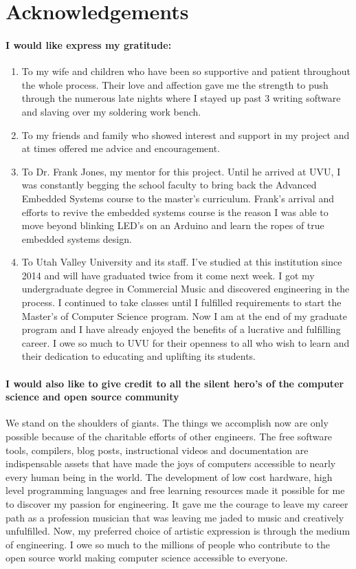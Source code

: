 \documentclass[acmlarge,screen]{acmart}
\begin{document}
\section{Acknowledgements}
	\paragraph{I would like express my gratitude:}
	\begin{enumerate}
		\item To my wife and children who have been so supportive and patient throughout the whole process. Their love and affection gave me the strength to push through the numerous late nights where I stayed up past 3 writing software and slaving over my soldering work bench.
		\item To my friends and family who showed interest and support in my project and at times offered me advice and encouragement.
		\item To Dr. Frank Jones, my mentor for this project. Until he arrived at UVU, I was constantly begging the school faculty to bring back the Advanced Embedded Systems course to the master's curriculum. Frank's arrival and efforts to revive the embedded systems course is the reason I was able to move beyond blinking LED's on an Arduino and learn the ropes of true embedded systems design.
		\item To Utah Valley University and its staff. I've studied at this institution since 2014 and will have graduated twice from it come next week. I got my undergraduate degree in Commercial Music and discovered engineering in the process. I continued to take classes until I fulfilled requirements to start the Master's of Computer Science program. Now I am at the end of my graduate program and I have already enjoyed the benefits of a lucrative and fulfilling career. I owe so much to UVU for their openness to all who wish to learn and their dedication to educating and uplifting its students.
	\end{enumerate}

	\paragraph{I would also like to give credit to all the silent hero's of the computer science and open source community} We stand on the shoulders of giants. The things we accomplish now are only possible because of the charitable efforts of other engineers. The free software tools, compilers, blog posts, instructional videos and documentation are indispensable assets that have made the joys of computers accessible to nearly every human being in the world. The development of low cost hardware, high level programming languages and free learning resources made it possible for me to discover my passion for engineering. It gave me the courage to leave my career path as a profession musician that was leaving me jaded to music and creatively unfulfilled. Now, my preferred choice of artistic expression is through the medium of engineering. I owe so much to the millions of people who contribute to the open source world making computer science accessible to everyone.
\end{document}
